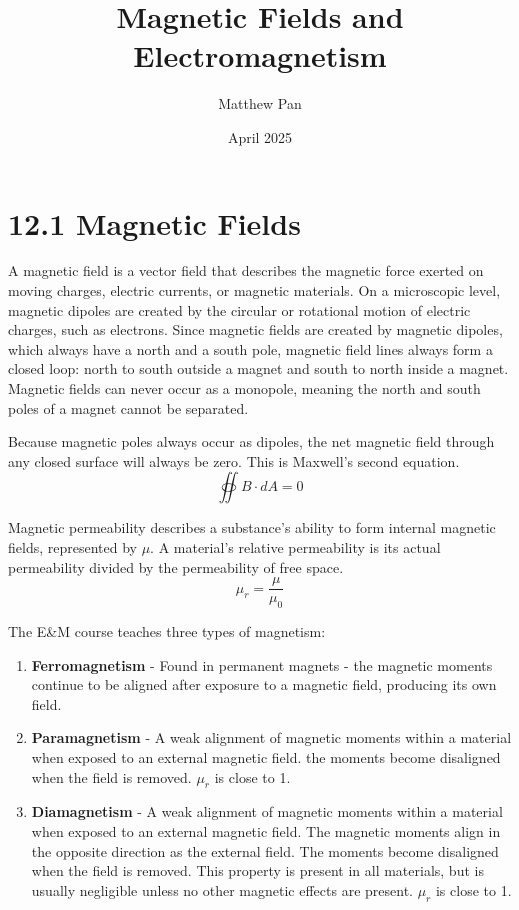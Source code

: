 \documentclass[12pt, titlepage]{article}
\title{Magnetic Fields and Electromagnetism}
\author{Matthew Pan}
\date{April 2025}
\begin{document}
\pagestyle{fancy}

\fancyhead{}
\fancyhead[R]{\thepage}

\maketitle

\section*{12.1 Magnetic Fields}

A magnetic field is a vector field that describes the magnetic force exerted on moving charges, electric currents, or magnetic materials. On a microscopic level, magnetic dipoles are created by the circular or rotational motion of electric charges, such as electrons. Since magnetic fields are created by magnetic dipoles, which always have a north and a south pole, magnetic field lines always form a closed loop: north to south outside a magnet and south to north inside a magnet. Magnetic fields can never occur as a monopole, meaning the north and south poles of a magnet cannot be separated.

Because magnetic poles always occur as dipoles, the net magnetic field through any closed surface will always be zero. This is Maxwell's second equation.
\begin{equation*}
    \oiint B \cdot dA = 0
\end{equation*}

Magnetic permeability describes a substance's ability to form internal magnetic fields, represented by $\mu$. A material's relative permeability is its actual permeability divided by the permeability of free space.
\begin{equation*}
    \mu_r = \frac{\mu}{\mu_0}
\end{equation*}

The E\&M course teaches three types of magnetism:
\begin{enumerate}
    \item \textbf{Ferromagnetism} - Found in permanent magnets - the magnetic moments continue to be aligned after exposure to a magnetic field, producing its own field. 
    \item \textbf{Paramagnetism} - A weak alignment of magnetic moments within a material when exposed to an external magnetic field. the moments become disaligned when the field is removed. $\mu_r$ is close to 1.
    \item \textbf{Diamagnetism} - A weak alignment of magnetic moments within a material when exposed to an external magnetic field. The magnetic moments align in the opposite direction as the external field. The moments become disaligned when the field is removed. This property is present in all materials, but is usually negligible unless no other magnetic effects are present. $\mu_r$ is close to 1.
\end{enumerate}
\end{document}
